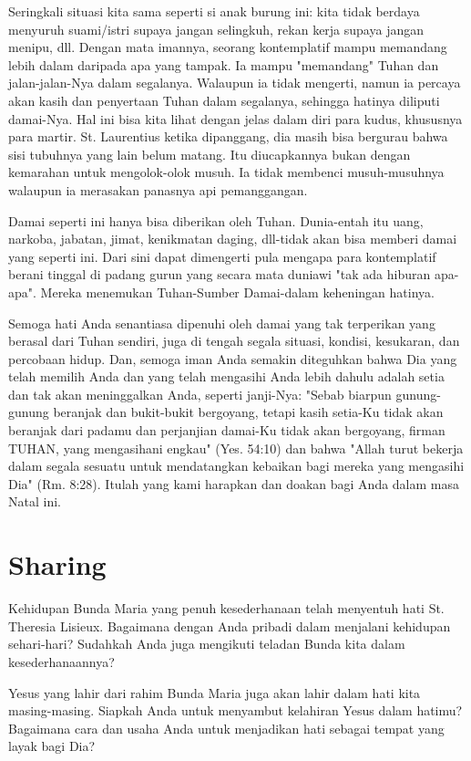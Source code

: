 Seringkali situasi kita sama seperti si anak burung ini: kita tidak berdaya menyuruh suami/istri supaya jangan selingkuh, rekan kerja supaya jangan menipu, dll. Dengan mata imannya, seorang kontemplatif mampu memandang lebih dalam daripada apa yang tampak. Ia mampu "memandang" Tuhan dan jalan-jalan-Nya dalam segalanya. Walaupun ia tidak mengerti, namun ia percaya akan kasih dan penyertaan Tuhan dalam segalanya, sehingga hatinya diliputi damai-Nya. Hal ini bisa kita lihat dengan jelas dalam diri para kudus, khususnya para martir. St. Laurentius ketika dipanggang, dia masih bisa bergurau bahwa sisi tubuhnya yang lain belum matang. Itu diucapkannya bukan dengan kemarahan untuk mengolok-olok musuh. Ia tidak membenci musuh-musuhnya walaupun ia merasakan panasnya api pemanggangan. 

Damai seperti ini hanya bisa diberikan oleh Tuhan. Dunia-entah itu uang, narkoba, jabatan, jimat, kenikmatan daging, dll-tidak akan bisa memberi damai yang seperti ini. Dari sini dapat dimengerti pula mengapa para kontemplatif berani tinggal di padang gurun yang secara mata duniawi "tak ada hiburan apa-apa". Mereka menemukan Tuhan-Sumber Damai-dalam keheningan hatinya.

Semoga hati Anda senantiasa dipenuhi oleh damai yang tak terperikan yang berasal dari Tuhan sendiri, juga di tengah segala situasi, kondisi, kesukaran, dan percobaan hidup. Dan, semoga iman Anda semakin diteguhkan bahwa Dia yang telah memilih Anda dan yang telah mengasihi Anda lebih dahulu adalah setia dan tak akan meninggalkan Anda, seperti janji-Nya: "Sebab biarpun gunung-gunung beranjak dan bukit-bukit bergoyang, tetapi kasih setia-Ku tidak akan beranjak dari padamu dan perjanjian damai-Ku tidak akan bergoyang, firman TUHAN, yang mengasihani engkau" (Yes. 54:10) dan bahwa "Allah turut bekerja dalam segala sesuatu untuk mendatangkan kebaikan bagi mereka yang mengasihi Dia" (Rm. 8:28). Itulah yang kami harapkan dan doakan bagi Anda dalam masa Natal ini. 

\section*{Sharing}

Kehidupan Bunda Maria yang penuh kesederhanaan telah menyentuh hati St. Theresia Lisieux. Bagaimana dengan Anda pribadi dalam menjalani kehidupan sehari-hari? Sudahkah Anda juga mengikuti teladan Bunda kita dalam kesederhanaannya? 

Yesus yang lahir dari rahim Bunda Maria juga akan lahir dalam hati kita masing-masing. Siapkah Anda untuk menyambut kelahiran Yesus dalam hatimu? Bagaimana cara dan usaha Anda untuk menjadikan hati sebagai tempat yang layak bagi Dia? 

